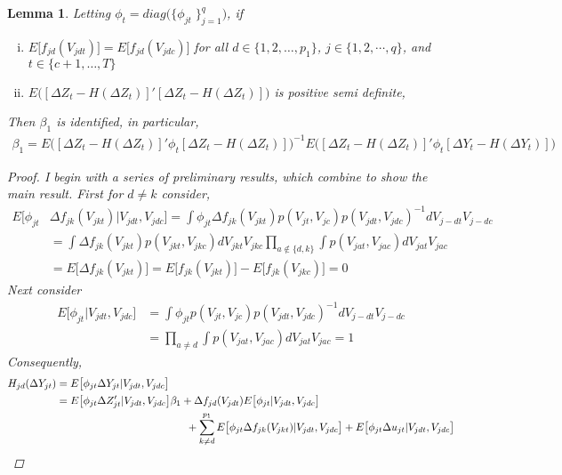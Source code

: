 \documentclass[10pt]{article}
\newtheorem{lemma}{Lemma}
\begin{document}
\begin{lemma}
Letting $\phi_{t} = diag\big( \{\phi_{jt}\;\}_{j=1}^q \big)$, if
\begin{enumerate}[i.)] 
\item $E\big[ f_{jd}(V_{jdt})\big] = E\big[ f_{jd}(V_{jdc}) \big] 
$ for all $d\in \{1,2, \ldots , p_1\}$, $j\in \{1,2, \cdots , q\}$, and $t\in \{c+1, \ldots , T\}$
%
\item $E \Big( [\Delta Z_t - H(\Delta Z_t)]' [\Delta Z_t - H(\Delta Z_t)] \Big)$ is positive semi definite,
%
\end{enumerate}
Then $\beta_1$ is identified, in particular,
\begin{align*} 
\beta_1 = E \Big( [\Delta Z_t - H(\Delta Z_t)]' \phi_{t} [\Delta Z_t - H(\Delta Z_t)] \Big)^{-1}E \Big( [\Delta Z_t - H(\Delta Z_t)]' \phi_{t} [\Delta Y_t - H(\Delta Y_t)] \Big)
\end{align*} 
%
\begin{proof} I begin with a series of preliminary results, which combine to show the main result. First for $d \neq k$ consider,
\begin{align*} 
E \big[ \phi_{jt} & \Delta f_{jk}(V_{jkt}) |V_{jdt},V_{jdc} \big]  = \int \phi_{jt} \Delta f_{jk}(V_{jkt}) p(V_{jt},V_{jc})p(V_{jdt},V_{jdc})^{-1}dV_{j-dt}V_{j-dc} \\
%
& = \int \Delta f_{jk}(V_{jkt}) p(V_{jkt},V_{jkc}) dV_{jkt} V_{jkc}\prod_{a \notin\{d,k\}}\int p(V_{jat},V_{jac}) dV_{jat} V_{jac} \\
& = E\big[ \Delta f_{jk}(V_{jkt}) \big] = E\big[ f_{jk}(V_{jkt}) \big]  - E\big[ f_{jk}(V_{jkc}) \big] = 0
\end{align*}
Next consider 
\begin{align*} 
E\big[\phi_{jt} | V_{jdt},V_{jdc}\big] &= \int \phi_{jt}p(V_{jt},V_{jc})p(V_{jdt},V_{jdc})^{-1}dV_{j-dt}V_{j-dc} \\
%
&= \prod_{a \neq d }\int p(V_{jat},V_{jac}) dV_{jat} V_{jac}  = 1
\end{align*}
Consequently, 
\begin{align*} 
H_{jd}(\Delta Y_{jt}) &= E\big[ \phi_{jt} \Delta Y_{jt} | V_{jdt},V_{jdc} \big] \\
%
& =E \big[ \phi_{jt} \Delta Z_{jt}' | V_{jdt},V_{jdc} \big]\beta_1 + \Delta f_{jd}(V_{jdt})E\big[\phi_{jt} | V_{jdt},V_{jdc}\big] \\
%
 &\hspace{4.3cm} + \sum_{k\neq d}^{p_1} E \big[ \phi_{jt} \Delta f_{jk}(V_{jkt}) | V_{jdt},V_{jdc} \big] + E\big[  \phi_{jt}\Delta u_{jt} | V_{jdt},V_{jdc} \big]  \\

\end{align*}
\end{proof}
\end{lemma}
\end{document}
